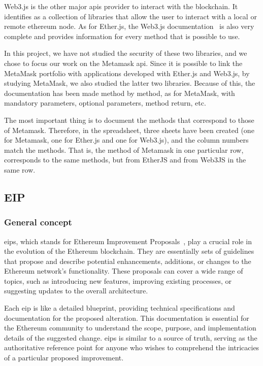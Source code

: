 \documentclass{iitFirstPage}
\begin{document}
    Web3.js is the other major \Glspl{api} provider to interact with the blockchain.
    It identifies as a collection of libraries that allow the user to interact with a local or remote ethereum node.
    As for Ether.js, the Web3.js documentation~\cite{web3doc} is also very complete and provides information for every method that is possible to use.

    \clearpage

    In this project, we have not studied the security of these two libraries, and we chose to focus our work on the Metamask \Gls{api}.
    Since it is possible to link the MetaMask portfolio with applications developed with Ether.js and Web3.js, by studying MetaMask, we also studied the latter two libraries.
    Because of this, the documentation has been made method by method, as for MetaMask, with mandatory parameters, optional parameters, method return, etc.

    The most important thing is to document the methods that correspond to those of Metamask.
    Therefore, in the spreadsheet, three sheets have been created (one for Metamask, one for Ether.js and one for Web3.js), and the column numbers match the methods.
    That is, the method of Metamask in one particular row, corresponds to the same methods, but from EtherJS and from Web3JS in the same row.


    \subsection{EIP}

    \subsubsection{General concept}

    \Glspl{eip}, which stands for Ethereum Improvement Proposals~\cite{eipdef}, play a crucial role in the evolution of the Ethereum blockchain.
    They are essentially sets of guidelines that propose and describe potential enhancements, additions, or changes to the Ethereum network's functionality.
    These proposals can cover a wide range of topics, such as introducing new features, improving existing processes, or suggesting updates to the overall architecture.

    Each \Gls{eip} is like a detailed blueprint, providing technical specifications and documentation for the proposed alteration.
    This documentation is essential for the Ethereum community to understand the scope, purpose, and implementation details of the suggested change.
    \Glspl{eip} is similar to a source of truth, serving as the authoritative reference point for anyone who wishes to comprehend the intricacies of a particular proposed improvement.
\end{document}
